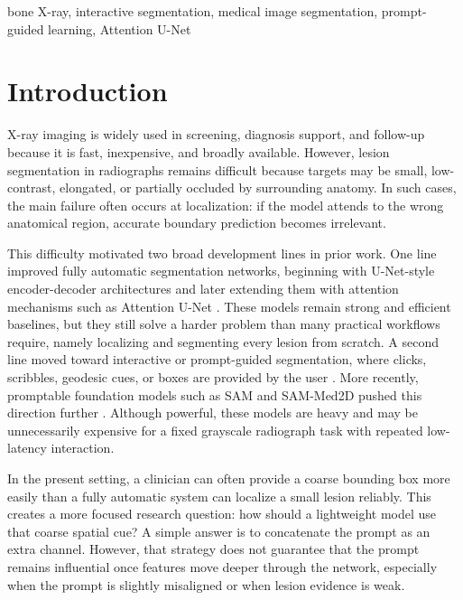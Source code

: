 \documentclass{ieeeaccess}
\begin{document}
\begin{keywords}
bone X-ray, interactive segmentation, medical image segmentation, prompt-guided learning, Attention U-Net
\end{keywords}

\titlepgskip=-15pt
\maketitle

\section{Introduction}
\label{sec:introduction}
 X-ray imaging is widely used in screening, diagnosis support, and follow-up because it is fast, inexpensive, and broadly available. However, lesion segmentation in radiographs remains difficult because targets may be small, low-contrast, elongated, or partially occluded by surrounding anatomy. In such cases, the main failure often occurs at localization: if the model attends to the wrong anatomical region, accurate boundary prediction becomes irrelevant.

This difficulty motivated two broad development lines in prior work. One line improved fully automatic segmentation networks, beginning with U-Net-style encoder-decoder architectures and later extending them with attention mechanisms such as Attention U-Net \cite{b3,b4}. These models remain strong and efficient baselines, but they still solve a harder problem than many practical workflows require, namely localizing and segmenting every lesion from scratch. A second line moved toward interactive or prompt-guided segmentation, where clicks, scribbles, geodesic cues, or boxes are provided by the user \cite{b5,b6}. More recently, promptable foundation models such as SAM and SAM-Med2D pushed this direction further \cite{b1,b2}. Although powerful, these models are heavy and may be unnecessarily expensive for a fixed grayscale radiograph task with repeated low-latency interaction.

In the present setting, a clinician can often provide a coarse bounding box more easily than a fully automatic system can localize a small lesion reliably. This creates a more focused research question: how should a lightweight model use that coarse spatial cue? A simple answer is to concatenate the prompt as an extra channel. However, that strategy does not guarantee that the prompt remains influential once features move deeper through the network, especially when the prompt is slightly misaligned or when lesion evidence is weak.
\end{document}
